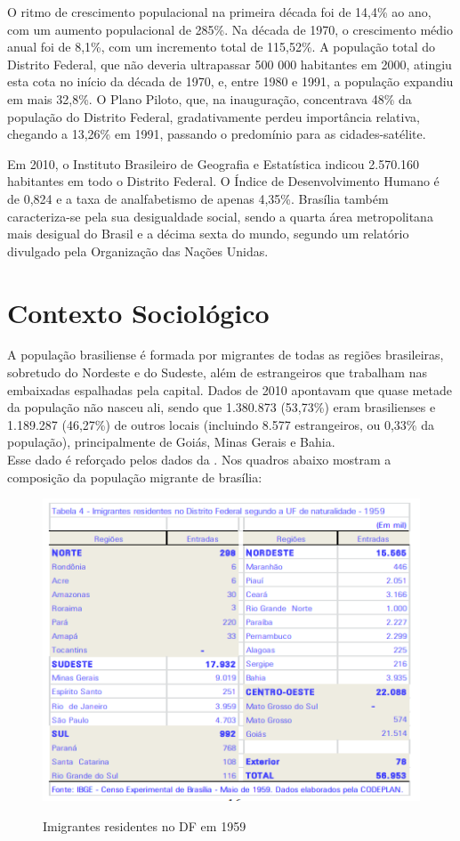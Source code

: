 O ritmo de crescimento populacional na primeira década foi de 14,4\% ao ano, com um aumento populacional de 285\%. Na década de 1970, o crescimento médio anual foi de 8,1\%, com um incremento total de 115,52\%. A população total do Distrito Federal, que não deveria ultrapassar 500 000 habitantes em 2000, atingiu esta cota no início da década de 1970, e, entre 1980 e 1991, a população expandiu em mais 32,8\%. O Plano Piloto, que, na inauguração, concentrava 48\% da população do Distrito Federal, gradativamente perdeu importância relativa, chegando a 13,26\% em 1991, passando o predomínio para as cidades-satélite.

Em 2010, o Instituto Brasileiro de Geografia e Estatística indicou 2.570.160 habitantes em todo o Distrito Federal. O Índice de Desenvolvimento Humano é de 0,824 e a taxa de analfabetismo de apenas 4,35\%. Brasília também caracteriza-se pela sua desigualdade social, sendo a quarta área metropolitana mais desigual do Brasil e a décima sexta do mundo, segundo um relatório divulgado pela Organização das Nações Unidas. \\

\section{Contexto Sociológico}

A população brasiliense é formada por migrantes de todas as regiões brasileiras, sobretudo do Nordeste e do Sudeste, além de estrangeiros que trabalham nas embaixadas espalhadas pela capital. Dados de 2010 apontavam que quase metade da população não nasceu ali, sendo que 1.380.873 (53,73\%) eram brasilienses e 1.189.287 (46,27\%) de outros locais (incluindo 8.577 estrangeiros, ou 0,33\% da população), principalmente de Goiás, Minas Gerais e Bahia.\\

Esse dado é reforçado pelos dados da . Nos quadros abaixo mostram a composição da população migrante de brasília:


\begin{figure}[h!]
    \centering
    \includegraphics{fig/imigrantes-1959}
    \label{table:imigrantes-1959}
    \caption{Imigrantes residentes no DF em 1959}
\end{figure}

